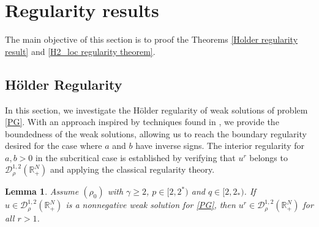 \documentclass[12pt,reqno]{amsart}
\newtheorem{lemma}[theorem]{Lemma}
\begin{document}
%
%
\section{Regularity results}

The main objective of this section is to proof the Theorems \ref{Holder regularity result} and \ref{H2_loc regularity theorem}.

\subsection{Hölder Regularity}

In this section, we investigate the Hölder regularity of weak solutions of problem \eqref{PG}. With an approach inspired by techniques found in \cite{Abreu-JM-Medeiros, Barrios, Drabek}, we provide the boundedness of the weak solutions, allowing us to reach the boundary regularity desired for the case where $a$ and $b$ have inverse signs. The interior regularity for $a,b>0$ in the subcritical case is established by verifying that $u^r$ belongs to $\mathcal{D}^{1,2}_\rho(\mathds{R}^N_+)$ and applying the classical regularity theory.

\begin{lemma}\label{u^r belongs D12} Assume $(\rho_0)$ with $\gamma\geq 2$, $p\in[2,2^\ast)$ and $q\in[2,2_\ast)$. If $u \in \mathcal{D}^{1,2}_\rho(\mathds{R}^N_+)$ is a nonnegative weak solution for \eqref{PG}, then $u^r \in \mathcal{D}^{1,2}_\rho(\mathds{R}^N_+)$ for all $r>1$.
    
\end{lemma}
\end{document}
